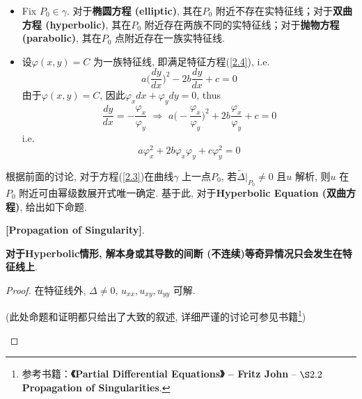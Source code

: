 \begin{defn}
\begin{rmk}
\begin{itemize}
				\item Fix $P_0 \in \gamma$. 对于\textbf{椭圆方程 (elliptic)}, 其在$P_0$ 附近不存在实特征线；对于\textbf{双曲方程 (hyperbolic)}, 其在$P_0$ 附近存在两族不同的实特征线；对于\textbf{抛物方程 (parabolic)}, 其在$P_0$ 点附近存在一族实特征线. 
				
				\vspace*{2em}
				
				\item 设$\varphi(x , y) = C$ 为一族特征线, 即满足特征方程(\ref{2.4}), i.e.
				\[ a \Big( \frac{dy}{dx} \Big)^2 - 2b \frac{dy}{dx} + c = 0 \]
				由于$\varphi(x , y) = C$, 因此$\varphi_{x} dx + \varphi_y dy = 0$, thus
				\[ 
				\frac{dy}{dx} = - \frac{\varphi_x}{\varphi_y} 
				\,\, \Rightarrow \,\, 
				a \Big( - \frac{\varphi_x}{\varphi_y} \Big)^2 + 2b \frac{\varphi_x}{\varphi_y} + c = 0 
				\]
				i.e.
				\[ a \varphi_{x}^2 + 2b \varphi_x \varphi_y + c \varphi_{y}^2 = 0 \]
			\end{itemize}
		\end{rmk}
	\end{defn}
	
	\vspace*{4em}
	
	根据前面的讨论, 对于方程(\ref{2.3})在曲线$\gamma$ 上一点$P_0$, 若$\widetilde{\Delta}|_{P_0} \neq 0$ 且$u$ 解析, 则$u$ 在$P_0$ 附近可由幂级数展开式唯一确定. 基于此, 对于\textbf{Hyperbolic Equation (双曲方程)}, 给出如下命题. 
	
	\vspace*{4em}
	
	\begin{proposition}\label{prop 2.1.1}
		\textbf{[Propagation of Singularity]}. 
		\begin{center}
			\textbf{对于Hyperbolic情形, 解本身或其导数的间断 (不连续)等奇异情况只会发生在特征线上}. 
		\end{center}
		
		\vspace*{2em}
		
		\begin{proof}
			在特征线外, $\Delta \neq 0$, $u_{xx} , u_{xy} , u_{yy}$ 可解. 
			\begin{center}
				(此处命题和证明都只给出了大致的叙述, 详细严谨的讨论可参见书籍\footnote{参考书籍：\textbf{《Partial Differential Equations》 -- Fritz John} -- $\S 2.2$ \textbf{Propagation of Singularities}. })
			\end{center}
		\end{proof}
	\end{proposition}

